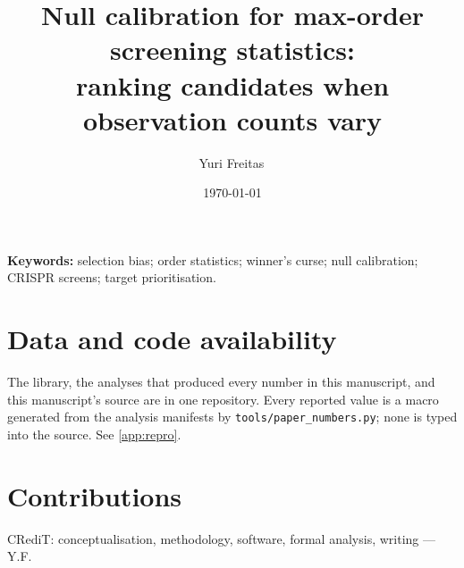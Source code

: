 \documentclass[11pt,a4paper]{article}
\title{Null calibration for max-order screening statistics:\\
       ranking candidates when observation counts vary}
\author[1]{Yuri Freitas\,\orcidlink{0000-0000-0000-0000}}
\affil[1]{Independent researcher}
\date{\today}
\begin{document}
\maketitle

\begin{abstract}

\end{abstract}

\noindent\textbf{Keywords:} selection bias; order statistics; winner's curse; null
calibration; CRISPR screens; target prioritisation.







\section*{Data and code availability}
The library, the analyses that produced every number in this manuscript, and this
manuscript's source are in one repository. Every reported value is a macro generated from
the analysis manifests by \texttt{tools/paper\_numbers.py}; none is typed into the source.
See \cref{app:repro}.

\section*{Contributions}
CRediT: conceptualisation, methodology, software, formal analysis, writing --- Y.F.

\printbibliography

\appendix

\end{document}
